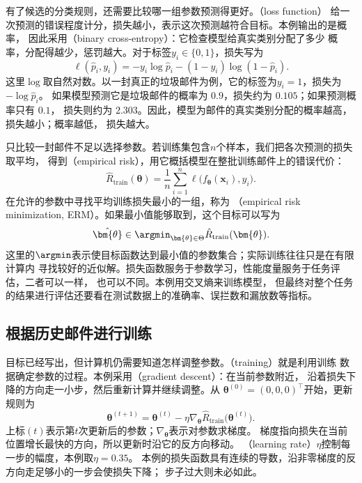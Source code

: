 有了候选的分类规则，还需要比较哪一组参数预测得更好。（loss function）
给一次预测的错误程度计分，损失越小，表示这次预测越符合目标。本例输出的是概率，
因此采用（binary cross-entropy）：它检查模型给真实类别分配了多少
概率，分配得越少，惩罚越大。对于标签$y_i\in\{0,1\}$，损失写为
\begin{equation}
  \ell(\hat{p}_i,y_i)
  =-y_i\log\hat{p}_i-(1-y_i)\log(1-\hat{p}_i).
  \label{eq:binary-cross-entropy}
\end{equation}
这里$\log$取自然对数。以一封真正的垃圾邮件为例，它的标签为$y_i=1$，损失为$-\log\hat{p}_i$。
如果模型预测它是垃圾邮件的概率为 $0.9$，损失约为 $0.105$；如果预测概率只有 $0.1$，
损失则约为 $2.303$。因此，模型为邮件的真实类别分配的概率越高，损失越小；概率越低，
损失越大。

只比较一封邮件不足以选择参数。若训练集包含$n$个样本，我们把各次预测的损失取平均，
得到（empirical risk），用它概括模型在整批训练邮件上的错误代价：
\begin{equation}
  \hat{R}_{\mathrm{train}}(\bm{\theta})
  =\frac{1}{n}\sum_{i=1}^{n}\ell\bigl(f_{\bm{\theta}}(\bm{x}_i),y_i\bigr).
  \label{eq:spam-empirical-risk}
\end{equation}
在允许的参数中寻找平均训练损失最小的一组，称为
（empirical risk minimization, ERM）。如果最小值能够取到，这个目标可以写为
\begin{equation}
  \hat{\bm{\theta}}
  \in\argmin_{\bm{\theta}\in\Theta}\hat{R}_{\mathrm{train}}(\bm{\theta}).
  \label{eq:spam-erm}
\end{equation}
这里的$\argmin$表示使目标函数达到最小值的参数集合；实际训练往往只是在有限计算内
寻找较好的近似解。损失函数服务于参数学习，性能度量服务于任务评估，二者可以一样，
也可以不同。本例用交叉熵来训练模型，
但最终对整个任务的结果进行评估还要看在测试数据上的准确率、误拦数和漏放数等指标。

\subsection{根据历史邮件进行训练}

目标已经写出，但计算机仍需要知道怎样调整参数。（training）就是利用训练
数据确定参数的过程。本例采用（gradient descent）：在当前参数附近，
沿着损失下降的方向走一小步，然后重新计算并继续调整。从
$\bm{\theta}^{(0)}=(0,0,0)^{\top}$开始，更新规则为
\begin{equation}
  \bm{\theta}^{(t+1)}
  =\bm{\theta}^{(t)}-\eta\nabla_{\bm{\theta}}
  \hat{R}_{\mathrm{train}}\bigl(\bm{\theta}^{(t)}\bigr).
  \label{eq:spam-gradient-update}
\end{equation}
上标$(t)$表示第$t$次更新后的参数；$\nabla_{\bm{\theta}}$表示对参数求梯度。
梯度指向损失在当前位置增长最快的方向，所以更新时沿它的反方向移动。
（learning rate）$\eta$控制每一步的幅度，本例取$\eta=0.35$。
本例的损失函数具有连续的导数，沿非零梯度的反方向走足够小的一步会使损失下降；
步子过大则未必如此。

